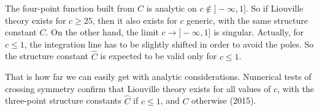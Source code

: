 \documentclass[12pt, a4paper]{article}
\theoremstyle{break}
\begin{document}
The four-point function built from $C$ is analytic on $c\notin ]-\infty,1]$. So if Liouville theory exists for $c\geq 25$, then it also exists for $c$ generic, with the same structure constant $C$. 
On the other hand, the limit $c\to ]-\infty, 1]$ is singular. Actually, for $c\leq 1$, the integration line has to be slightly shifted in order to avoid the poles. So the structure constant $\hat C$ is expected to be valid only for $c\leq 1$.

That is how far we can easily get with analytic considerations. 
Numerical tests of crossing symmetry confirm that Liouville theory exists for all values of $c$, with the three-point structure constants $\hat C$ if $c\leq 1$, and $C$ otherwise \cite{rs15} (2015).



\end{document}
